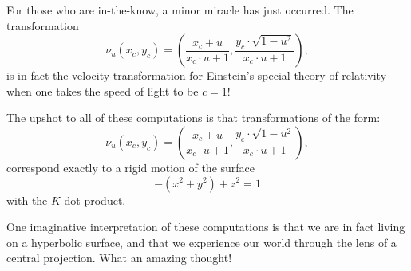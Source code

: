 \documentclass[12pt,noauthor,nooutcomes,handout,newpage]{ximera}
\begin{document}
For those who are in-the-know, a minor miracle has just occurred. The transformation
\[
  \nu_u(x_c,y_c) = \left(\frac{x_c + u}{x_c\cdot u + 1},\frac{y_c\cdot \sqrt{1-u^2}}{x_c\cdot u+1}\right),
\]
is in fact the velocity transformation for Einstein's special theory
of relativity when one takes the speed of light to be $c=1$!

The upshot to all of these computations is that transformations of the form:
\[
\nu_u(x_c,y_c) = \left(\frac{x_c + u}{x_c\cdot u + 1},\frac{y_c\cdot \sqrt{1-u^2}}{x_c\cdot u+1}\right),
\]
correspond exactly to a rigid motion of the surface
\[
-(x^2+y^2) + z^2 =1
\]
with the $K$-dot product.


One imaginative interpretation of these computations is that we are in
fact living on a hyperbolic surface, and that we experience our world
through the lens of a central projection.
What an amazing thought!
\end{document}
